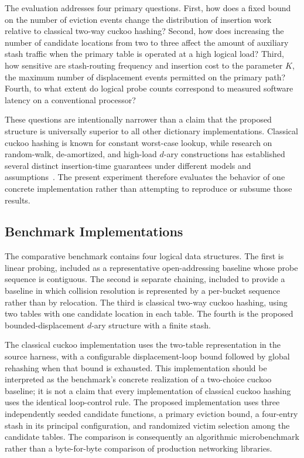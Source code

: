 \documentclass[conference]{IEEEtran}
\begin{document}
The evaluation addresses four primary questions. First, how does a fixed bound
on the number of eviction events change the distribution of insertion work
relative to classical two-way cuckoo hashing? Second, how does increasing the
number of candidate locations from two to three affect the amount of auxiliary
stash traffic when the primary table is operated at a high logical load? Third,
how sensitive are stash-routing frequency and insertion cost to the parameter
$K$, the maximum number of displacement events permitted on the primary path?
Fourth, to what extent do logical probe counts correspond to measured software
latency on a conventional processor?

These questions are intentionally narrower than a claim that the proposed
structure is universally superior to all other dictionary implementations.
Classical cuckoo hashing is known for constant worst-case lookup, while
research on random-walk, de-amortized, and high-load $d$-ary constructions has
established several distinct insertion-time guarantees under different models
and assumptions~\cite{pagh2004cuckoo,arbitman2009deamortized,fountoulakis2010insertion,walzer2022insertion,bell2024constant,kuszmaul2025bubbling}.
The present experiment therefore evaluates the behavior of one concrete
implementation rather than attempting to reproduce or subsume those results.

\subsection{Benchmark Implementations}

The comparative benchmark contains four logical data structures. The first is
linear probing, included as a representative open-addressing baseline whose
probe sequence is contiguous. The second is separate chaining, included to
provide a baseline in which collision resolution is represented by a per-bucket
sequence rather than by relocation. The third is classical two-way cuckoo
hashing, using two tables with one candidate location in each table. The fourth
is the proposed bounded-displacement $d$-ary structure with a finite stash.

The classical cuckoo implementation uses the two-table representation in the
source harness, with a configurable displacement-loop bound followed by global
rehashing when that bound is exhausted. This implementation should be
interpreted as the benchmark's concrete realization of a two-choice cuckoo
baseline; it is not a claim that every implementation of classical cuckoo
hashing uses the identical loop-control rule. The proposed implementation uses
three independently seeded candidate functions, a primary eviction bound, a
four-entry stash in its principal configuration, and randomized victim
selection among the candidate tables. The comparison is consequently an
algorithmic microbenchmark rather than a byte-for-byte comparison of production
networking libraries.
\end{document}
